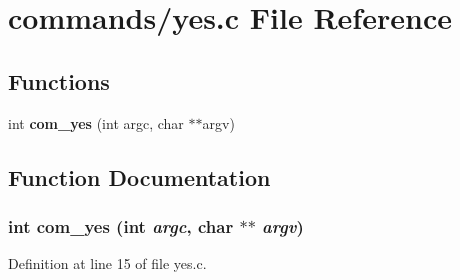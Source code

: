 \section{commands/yes.c File Reference}
\label{yes_8c}
\subsection*{Functions}
\begin{DoxyCompactItemize}
\item 
int {\bf com\_\-yes} (int argc, char $\ast$$\ast$argv)
\end{DoxyCompactItemize}


\subsection{Function Documentation}
\subsubsection[{com\_\-yes}]{\setlength{\rightskip}{0pt plus 5cm}int com\_\-yes (int {\em argc}, \/  char $\ast$$\ast$ {\em argv})}\label{yes_8c_a7c476e07b611d8d2989a914b486f3eb1}


Definition at line 15 of file yes.c.

